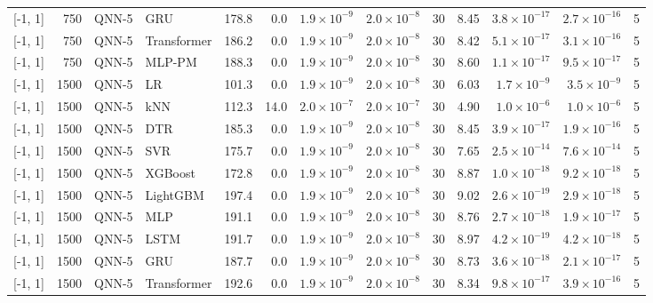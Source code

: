 \begin{longtable}{lrllrrrrrrrrr}
{[-1, 1]} & 750 & QNN-5 & GRU & 178.8 & 0.0 & $1.9 \times 10^{-9}$ & $2.0 \times 10^{-8}$ & 30 & 8.45 & $3.8 \times 10^{-17}$ & $2.7 \times 10^{-16}$ & 5 \\
{[-1, 1]} & 750 & QNN-5 & Transformer & 186.2 & 0.0 & $1.9 \times 10^{-9}$ & $2.0 \times 10^{-8}$ & 30 & 8.42 & $5.1 \times 10^{-17}$ & $3.1 \times 10^{-16}$ & 5 \\
{[-1, 1]} & 750 & QNN-5 & MLP-PM & 188.3 & 0.0 & $1.9 \times 10^{-9}$ & $2.0 \times 10^{-8}$ & 30 & 8.60 & $1.1 \times 10^{-17}$ & $9.5 \times 10^{-17}$ & 5 \\
\midrule
{[-1, 1]} & 1500 & QNN-5 & LR & 101.3 & 0.0 & $1.9 \times 10^{-9}$ & $2.0 \times 10^{-8}$ & 30 & 6.03 & $1.7 \times 10^{-9}$ & $3.5 \times 10^{-9}$ & 5 \\
{[-1, 1]} & 1500 & QNN-5 & kNN & 112.3 & 14.0 & $2.0 \times 10^{-7}$ & $2.0 \times 10^{-7}$ & 30 & 4.90 & $1.0 \times 10^{-6}$ & $1.0 \times 10^{-6}$ & 5 \\
{[-1, 1]} & 1500 & QNN-5 & DTR & 185.3 & 0.0 & $1.9 \times 10^{-9}$ & $2.0 \times 10^{-8}$ & 30 & 8.45 & $3.9 \times 10^{-17}$ & $1.9 \times 10^{-16}$ & 5 \\
{[-1, 1]} & 1500 & QNN-5 & SVR & 175.7 & 0.0 & $1.9 \times 10^{-9}$ & $2.0 \times 10^{-8}$ & 30 & 7.65 & $2.5 \times 10^{-14}$ & $7.6 \times 10^{-14}$ & 5 \\
{[-1, 1]} & 1500 & QNN-5 & XGBoost & 172.8 & 0.0 & $1.9 \times 10^{-9}$ & $2.0 \times 10^{-8}$ & 30 & 8.87 & $1.0 \times 10^{-18}$ & $9.2 \times 10^{-18}$ & 5 \\
{[-1, 1]} & 1500 & QNN-5 & LightGBM & 197.4 & 0.0 & $1.9 \times 10^{-9}$ & $2.0 \times 10^{-8}$ & 30 & 9.02 & $2.6 \times 10^{-19}$ & $2.9 \times 10^{-18}$ & 5 \\
{[-1, 1]} & 1500 & QNN-5 & MLP & 191.1 & 0.0 & $1.9 \times 10^{-9}$ & $2.0 \times 10^{-8}$ & 30 & 8.76 & $2.7 \times 10^{-18}$ & $1.9 \times 10^{-17}$ & 5 \\
{[-1, 1]} & 1500 & QNN-5 & LSTM & 191.7 & 0.0 & $1.9 \times 10^{-9}$ & $2.0 \times 10^{-8}$ & 30 & 8.97 & $4.2 \times 10^{-19}$ & $4.2 \times 10^{-18}$ & 5 \\
{[-1, 1]} & 1500 & QNN-5 & GRU & 187.7 & 0.0 & $1.9 \times 10^{-9}$ & $2.0 \times 10^{-8}$ & 30 & 8.73 & $3.6 \times 10^{-18}$ & $2.1 \times 10^{-17}$ & 5 \\
{[-1, 1]} & 1500 & QNN-5 & Transformer & 192.6 & 0.0 & $1.9 \times 10^{-9}$ & $2.0 \times 10^{-8}$ & 30 & 8.34 & $9.8 \times 10^{-17}$ & $3.9 \times 10^{-16}$ & 5 \\

\end{longtable}
